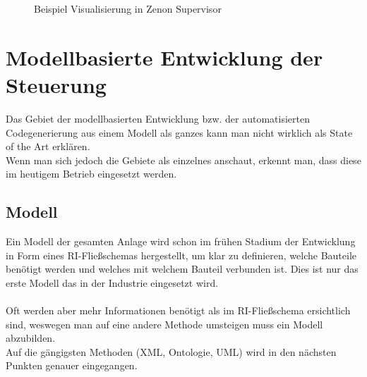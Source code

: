 \begin{figure}[hbt!]
 \centering
	\caption{Beispiel Visualisierung in Zenon Supervisor}
\end{figure}


\newpage

\section{Modellbasierte Entwicklung der Steuerung} \label{modellbasierte_entwicklung}
Das Gebiet der modellbasierten Entwicklung bzw. der automatisierten Codegenerierung aus einem Modell als ganzes kann man nicht wirklich als State of the Art erklären.\\
Wenn man sich jedoch die Gebiete als einzelnes anschaut, erkennt man, dass diese im heutigem Betrieb eingesetzt werden. 
\subsection{Modell}
Ein Modell der gesamten Anlage wird schon im frühen Stadium der Entwicklung in Form eines RI-Fließschemas hergestellt, um klar zu definieren, welche Bauteile benötigt werden und welches mit welchem Bauteil verbunden ist. Dies ist nur das erste Modell das in der Industrie eingesetzt wird.\\
\\
Oft werden aber mehr Informationen benötigt als im RI-Fließschema ersichtlich sind, weswegen man auf eine andere Methode umsteigen muss ein Modell abzubilden.\\
Auf die gängigsten Methoden (XML, Ontologie, UML) wird in den nächsten Punkten genauer eingegangen.
